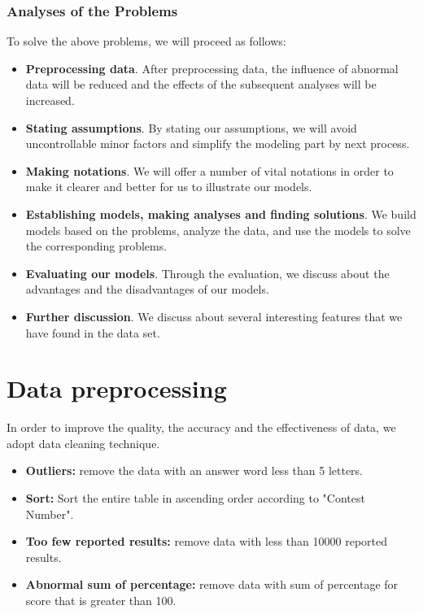 \documentclass{mcmthesis}
\begin{document}
\subsubsection{Analyses of the Problems}
To solve the above problems, we will proceed as follows:
\begin{itemize}
\item {\bf Preprocessing data}. After preprocessing data, the influence of abnormal data will be reduced and the effects of the subsequent analyses will be increased.

\item {\bf Stating assumptions}. By stating our assumptions, we will avoid uncontrollable minor factors and simplify the modeling part by next process.

\item {\bf Making notations}. We will offer a number of vital notations in order to make it clearer and better for us to illustrate our models.

\item {\bf Establishing models, making analyses and finding solutions}. We build models based on the problems, analyze the data, and use the models to solve the corresponding problems.

\item {\bf Evaluating our models}. Through the evaluation, we discuss about the advantages and the disadvantages of our models. 

\item {\bf Further discussion}. We discuss about several interesting features that we have found in the data set.


\end{itemize}

\section{Data preprocessing}
In order to improve the quality, the accuracy and the effectiveness of data, we adopt data cleaning technique. 
\begin{itemize}
    \item {\bf Outliers:} remove the data with an answer word less than 5 letters.
    \item {\bf Sort:} Sort the entire table in ascending order according to "Contest Number".
    \item {\bf Too few reported results:} remove data with less than 10000 reported results.
    \item {\bf Abnormal sum of percentage:} remove data with sum of percentage for score that is greater than 100.
\end{itemize}
\end{document}
